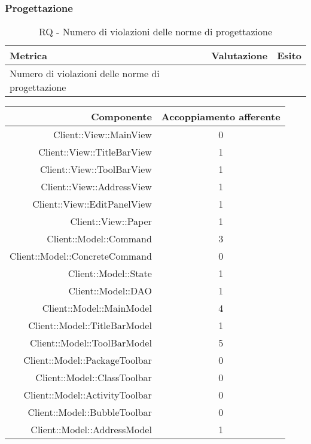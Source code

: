 \documentclass[../PianoDiQualifica.tex]{subfiles}
\begin{document}
				\subsubsection{Progettazione}
					\begin{table}[H]
					\center
						\begin{tabular}{|l|c|c|}
							\hline
							\rowcolor{blue!30}\textbf{Metrica} & \textbf{Valutazione} & \textbf{Esito} \\ \hline
							Numero di violazioni delle norme di progettazione &  &  \\ \hline
						\end{tabular}
					\caption{RQ - Numero di violazioni delle norme di progettazione}
					\end{table}
					\begin{longtable}{|r|c|}
						\hline
						\rowcolor{blue!30}\textbf{Componente} & \textbf{Accoppiamento afferente} \\
						\hline
						\endhead
						Client::View::MainView & 0 \\ \hline
						Client::View::TitleBarView & 1 \\ \hline
						Client::View::ToolBarView & 1 \\ \hline
						Client::View::AddressView & 1 \\ \hline
						Client::View::EditPanelView & 1 \\ \hline
						Client::View::Paper & 1 \\ \hline
						Client::Model::Command & 3\\ \hline
						Client::Model::ConcreteCommand & 0 \\ \hline
						Client::Model::State & 1 \\ \hline
						Client::Model::DAO & 1 \\ \hline
						Client::Model::MainModel &4 \\ \hline
						Client::Model::TitleBarModel & 1 \\ \hline
						Client::Model::ToolBarModel & 5 \\ \hline
						Client::Model::PackageToolbar & 0 \\ \hline
						Client::Model::ClassToolbar & 0 \\ \hline
						Client::Model::ActivityToolbar & 0 \\ \hline
						Client::Model::BubbleToolbar & 0 \\ \hline
						Client::Model::AddressModel & 1 \\ \hline

\end{longtable}
\end{document}
